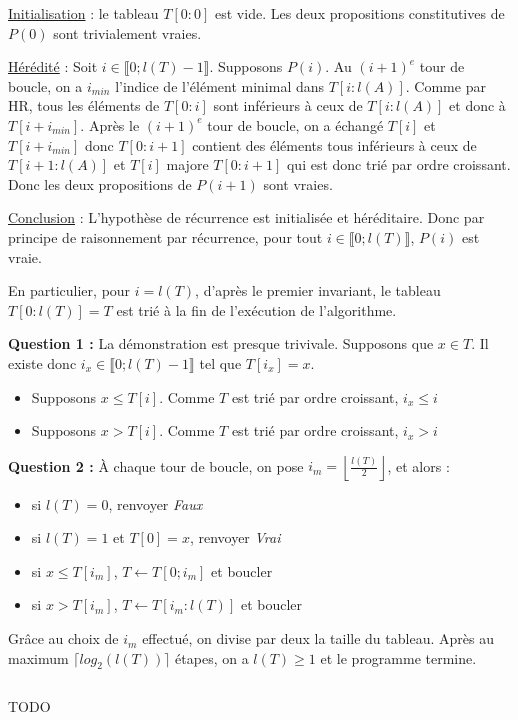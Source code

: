 \documentclass[../main.tex]{subfiles}
\begin{document}
\underline{Initialisation} : le tableau $T[0:0]$ est vide. Les deux propositions constitutives de $P(0)$ sont trivialement vraies.

\underline{Hérédité} : Soit $i\in\llbracket 0; l(T) - 1\rrbracket$. Supposons $P(i)$. Au $(i + 1)^e$ tour de boucle, on a $i_{min}$ l'indice de l'élément minimal dans $T[i:l(A)]$. Comme par HR, tous les éléments de $T[0:i]$ sont inférieurs à ceux de $T[i:l(A)]$ et donc à $T[i + i_{min}]$. Après le $(i+1)^e$ tour de boucle, on a échangé $T[i]$ et $T[i + i_{min}]$ donc $T[0:i+1]$ contient des éléments tous inférieurs à ceux de $T[i+1:l(A)]$ et $T[i]$ majore $T[0:i+1]$ qui est donc trié par ordre croissant. \newline
Donc les deux propositions de $P(i+1)$ sont vraies.

\underline{Conclusion} : L'hypothèse de récurrence est initialisée et héréditaire. Donc par principe de raisonnement par récurrence, pour tout $i\in\llbracket 0; l(T)\rrbracket$, $P(i)$ est vraie.

En particulier, pour $i = l(T)$, d'après le premier invariant, le tableau $T[0:l(T)] = T$ est trié à la fin de l'exécution de l'algorithme.


\textbf{Question 1 :} La démonstration est presque trivivale. Supposons que $x\in T$. Il existe donc $i_x\in \llbracket{0; l(T)-1}\rrbracket$ tel que $T[i_x] = x$. 
\begin{itemize}
	\item Supposons $x\leq T[i]$. Comme $T$ est trié par ordre croissant, $i_x \leq i$
	\item Supposons $x > T[i]$. Comme $T$ est trié par ordre croissant, $i_x > i$ 
\end{itemize}
\textbf{Question 2 :} À chaque tour de boucle, on pose $i_m = \left\lfloor \frac{l(T)}{2}\right\rfloor$, et alors :
\begin{itemize}
	\item si $l(T) = 0$, renvoyer \textit{Faux}
	\item si $l(T) = 1$ et $T[0] = x$, renvoyer \textit{Vrai}
	\item si $x\leq T[i_m]$, $T\leftarrow T[0; i_m]$ et boucler
	\item si $x > T[i_m]$, $T\leftarrow T[i_m:l(T)]$ et boucler
\end{itemize}
Grâce au choix de $i_m$ effectué, on divise par deux la taille du tableau. Après au maximum $\lceil log_2(l(T))\rceil$ étapes, on a $l(T) \geq 1$ et le programme termine.
\inputminted{c}{solutions/dichotomique.c}
TODO
\end{document}

